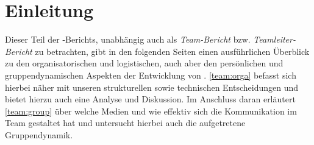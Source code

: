 
\section{Einleitung}

Dieser Teil der \erasim{}-Berichts, unabhängig auch als \emph{Team-Bericht} bzw.
\emph{Teamleiter-Bericht} zu betrachten, gibt in den folgenden Seiten einen
ausführlichen Überblick zu den organisatorischen und logistischen, auch aber den
persönlichen und gruppendynamischen Aspekten der Entwicklung von \erasim{}.
\autoref{team:orga} befasst sich hierbei näher mit unseren strukturellen sowie
technischen Entscheidungen und bietet hierzu auch eine Analyse und Diskussion.
Im Anschluss daran erläutert \autoref{team:group} über welche Medien und wie
effektiv sich die Kommunikation im Team gestaltet hat und untersucht hierbei
auch die aufgetretene Gruppendynamik.
